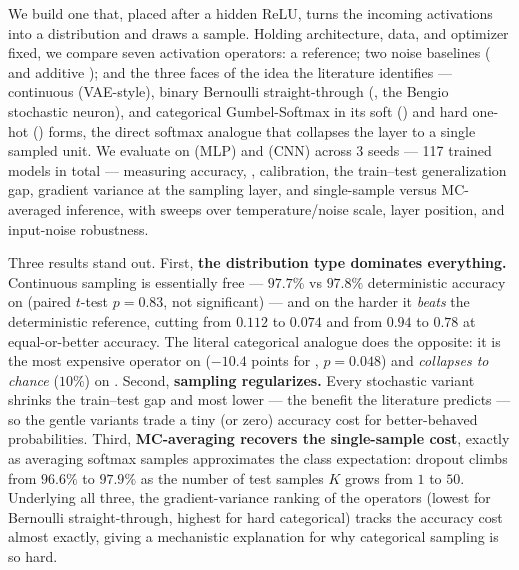  We build one \samplinglayer{} that, placed after a hidden ReLU, turns the incoming activations into a distribution and draws a sample. Holding architecture, data, and optimizer fixed, we compare seven activation operators: a \detmode{} reference; two noise baselines (\dropout{} and additive \gaussnoise); and the three faces of the idea the literature identifies --- continuous \gaussreparam{} (VAE-style), binary Bernoulli straight-through (\bernoullist{}, the Bengio stochastic neuron), and categorical Gumbel-Softmax in its soft (\gumbelsoft) and hard one-hot (\gumbelst) forms, the direct softmax analogue that collapses the layer to a single sampled unit. We evaluate on \mnist{} (MLP) and \cifar{} (CNN) across 3 seeds --- 117 trained models in total --- measuring accuracy, \nll{}, \ece{} calibration, the train--test generalization gap, gradient variance at the sampling layer, and single-sample versus MC-averaged inference, with sweeps over temperature/noise scale, layer position, and input-noise robustness.

 Three results stand out. First, {\bf the distribution type dominates everything.} Continuous \gaussreparam{} sampling is essentially free --- $97.7\%$ vs $97.8\%$ deterministic accuracy on \mnist{} (paired $t$-test $p\!=\!0.83$, not significant) --- and on the harder \cifar{} it \emph{beats} the deterministic reference, cutting \ece{} from $0.112$ to $0.074$ and \nll{} from $0.94$ to $0.78$ at equal-or-better accuracy. The literal categorical analogue does the opposite: it is the most expensive operator on \mnist{} ($-10.4$ points for \gumbelst, $p\!=\!0.048$) and \emph{collapses to chance} ($10\%$) on \cifar{}. Second, {\bf sampling regularizes.} Every stochastic variant shrinks the train--test gap and most lower \ece{} --- the benefit the literature predicts --- so the gentle variants trade a tiny (or zero) accuracy cost for better-behaved probabilities. Third, {\bf MC-averaging recovers the single-sample cost}, exactly as averaging softmax samples approximates the class expectation: dropout climbs from $96.6\%$ to $97.9\%$ as the number of test samples $K$ grows from $1$ to $50$. Underlying all three, the gradient-variance ranking of the operators (lowest for Bernoulli straight-through, highest for hard categorical) tracks the accuracy cost almost exactly, giving a mechanistic explanation for why categorical sampling is so hard.

